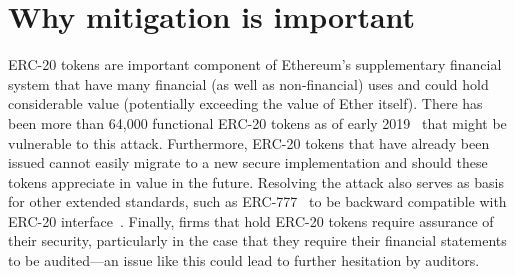 \section{Why mitigation is important}
ERC-20 tokens are important component of Ethereum's supplementary financial system that have many financial (as well as non-financial) uses and could hold considerable value (potentially exceeding the value of Ether itself). There has been more than 64,000 functional ERC-20 tokens as of early 2019~\cite{victormeasuring} that might be vulnerable to this attack. Furthermore, ERC-20 tokens that have already been issued cannot easily migrate to a new secure implementation and should these tokens appreciate in value in the future. Resolving the attack also serves as basis for other extended standards, such as ERC-777~\cite{EIP777} to be backward compatible with ERC-20 interface~\cite{frowis2018detecting}. Finally, firms that hold ERC-20 tokens require assurance of their security, particularly in the case that they require their financial statements to be audited---an issue like this could lead to further hesitation by auditors.

